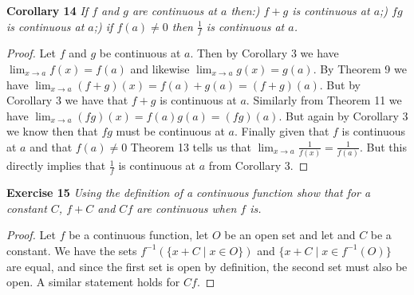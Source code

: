 \documentclass{article}
\begin{document}
\begin{flushleft}
\textbf{Corollary 14}
\textsl{If $f$ and $g$ are continuous at $a$ then:) $f+g$ is continuous at $a$;) $fg$ is continuous at $a$;) if $f(a) \neq 0$ then $\frac{1}{f}$ is continuous at $a$.}
\begin{proof}
Let $f$ and $g$ be continuous at $a$. Then by Corollary 3 we have $\lim_{x \rightarrow a} f(x) = f(a)$ and likewise $\lim_{x \rightarrow a} g(x) = g(a)$. By Theorem 9 we have $\lim_{x \rightarrow a} (f+g)(x)=f(a)+g(a)=(f+g)(a)$. But by Corollary 3 we have that $f+g$ is continuous at $a$. Similarly from Theorem 11 we have $\lim_{x \rightarrow a} (fg)(x) = f(a)g(a)=(fg)(a)$. But again by Corollary 3 we know then that $fg$ must be continuous at $a$. Finally given that $f$ is continuous at $a$ and that $f(a) \neq 0$ Theorem 13 tells us that $\lim_{x \rightarrow a} \frac{1}{f(x)} = \frac{1}{f(a)}$. But this directly implies that $\frac{1}{f}$ is continuous at $a$ from Corollary 3.
\end{proof}

\textbf{Exercise 15}
\textsl{Using the definition of a continuous function show that for a constant $C$, $f+C$ and $Cf$ are continuous when $f$ is.}
\begin{proof}
Let $f$ be a continuous function, let $O$ be an open set and let and $C$ be a constant. We have the sets $f^{-1}(\{x + C \mid x \in O\})$ and $\{x + C \mid x \in f^{-1}(O)\}$ are equal, and since the first set is open by definition, the second set must also be open. A similar statement holds for $Cf$.
\end{proof}

\end{flushleft}
\end{document}
